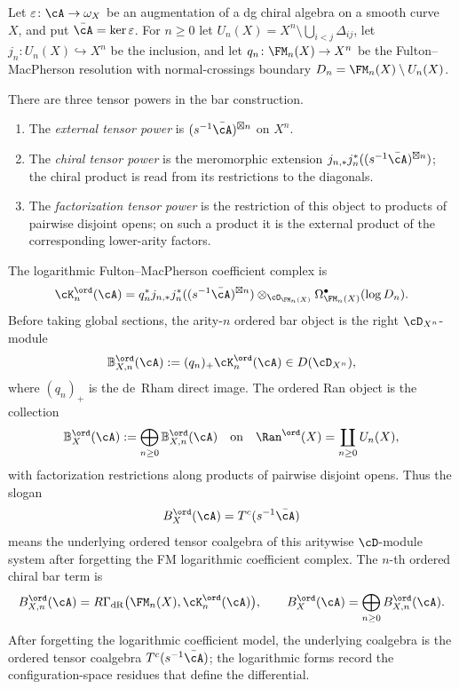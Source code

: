 \begin{definition}
\label{def:ordered-chiral-bar-term-log}
Let $\varepsilon\colon\cA\to\omega_X$ be an augmentation of a
dg chiral algebra on a smooth curve~$X$, and put
$\bar\cA=\ker\varepsilon$. For $n\ge0$ let
$U_n(X)=X^n\setminus\bigcup_{i<j}\Delta_{ij}$, let
$j_n\colon U_n(X)\hookrightarrow X^n$ be the inclusion, and let
$q_n\colon\FM_n(X)\to X^n$ be the Fulton--MacPherson resolution with
normal-crossings boundary $D_n=\FM_n(X)\setminus U_n(X)$.

There are three tensor powers in the bar construction.
\begin{enumerate}[label=\textup{(\alph*)}]
\item The \emph{external tensor power} is
 $(s^{-1}\bar\cA)^{\boxtimes n}$ on $X^n$.
\item The \emph{chiral tensor power} is the meromorphic extension
 $j_{n,*}j_n^*((s^{-1}\bar\cA)^{\boxtimes n})$; the chiral product
 is read from its restrictions to the diagonals.
\item The \emph{factorization tensor power} is the restriction of this
 object to products of pairwise disjoint opens; on such a product it
 is the external product of the corresponding lower-arity factors.
\end{enumerate}
The logarithmic Fulton--MacPherson coefficient complex is
\[
\cK^{\ord}_n(\cA)
=
q_n^*j_{n,*}j_n^*((s^{-1}\bar\cA)^{\boxtimes n})
\otimes_{\cO_{\FM_n(X)}}
\Omega^\bullet_{\FM_n(X)}(\log D_n).
\]
Before taking global sections, the arity-$n$ ordered bar object is the
right $\cD_{X^n}$-module
\[
\mathbb B^{\ord}_{X,n}(\cA)
:=
(q_n)_+
\cK^{\ord}_n(\cA)
\in D(\cD_{X^n}),
\]
where $(q_n)_+$ is the de~Rham direct image. The ordered Ran object is
the collection
\[
\mathbb B^{\ord}_X(\cA)
:=\bigoplus_{n\ge0}\mathbb B^{\ord}_{X,n}(\cA)
\quad\text{on}\quad
\Ran^{\ord}(X)=\coprod_{n\ge0}U_n(X),
\]
with factorization restrictions along products of pairwise disjoint
opens. Thus the slogan
\[
B_X^{\ord}(\cA)=T^c(s^{-1}\bar\cA)
\]
means the underlying ordered tensor coalgebra of this aritywise
$\cD$-module system after forgetting the FM logarithmic coefficient
complex.
The $n$-th ordered chiral bar term is
\[
B^{\ord}_{X,n}(\cA)
=
R\Gamma_{\mathrm{dR}}\bigl(\FM_n(X),\cK^{\ord}_n(\cA)\bigr),
\qquad
B_X^{\ord}(\cA)=\bigoplus_{n\ge0}B^{\ord}_{X,n}(\cA).
\]
After forgetting the logarithmic coefficient model, the underlying
coalgebra is the ordered tensor coalgebra
$T^c(s^{-1}\bar\cA)$; the logarithmic forms record the
configuration-space residues that define the differential.
\end{definition}

